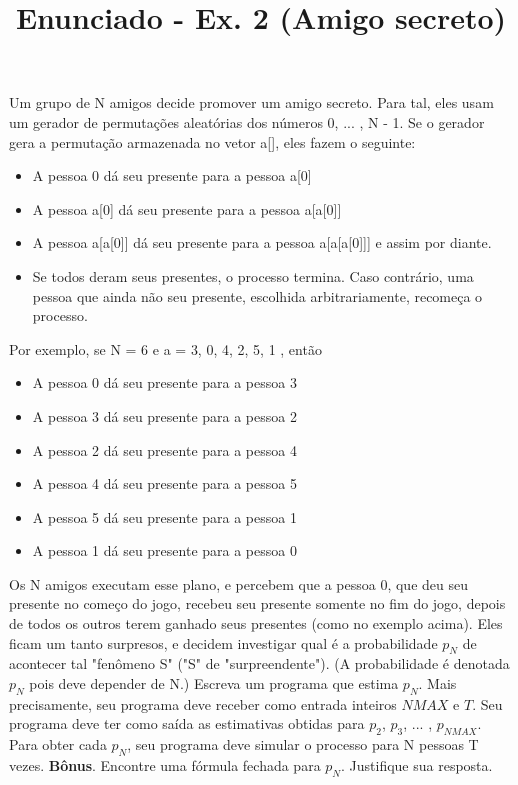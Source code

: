 \documentclass{article}
\title{Enunciado - Ex. 2 (Amigo secreto)}
\date{}
\author{}
\begin{document}
\maketitle

Um grupo de N amigos decide promover um amigo secreto. Para tal, eles usam um gerador de permuta\c{c}\~oes aleat\'orias dos n\'umeros 0, ... , N - 1. Se o gerador gera a permuta\c{c}\~ao armazenada no vetor a[], eles fazem o seguinte:
\begin{itemize}
  \item A pessoa 0 d\'a seu presente para a pessoa a[0]
  \item A pessoa a[0] d\'a seu presente para a pessoa a[a[0]]
  \item A pessoa a[a[0]] d\'a seu presente para a pessoa a[a[a[0]]] e assim por diante.
  \item Se todos deram seus presentes, o processo termina. Caso contr\'ario, uma pessoa que ainda n\~ao seu presente, escolhida arbitrariamente, recome\c{c}a o processo.
\end{itemize}
Por exemplo, se N = 6 e a = { 3, 0, 4, 2, 5, 1 }, ent\~ao
\begin{itemize}
\item A pessoa 0 d\'a seu presente para a pessoa 3
\item A pessoa 3 d\'a seu presente para a pessoa 2
\item A pessoa 2 d\'a seu presente para a pessoa 4
\item A pessoa 4 d\'a seu presente para a pessoa 5
\item A pessoa 5 d\'a seu presente para a pessoa 1
\item A pessoa 1 d\'a seu presente para a pessoa 0
\end{itemize}
Os N amigos executam esse plano, e percebem que a pessoa 0, que deu seu presente no come\c{c}o do jogo, recebeu seu presente somente no fim do jogo, depois de todos os outros terem ganhado seus presentes (como no exemplo acima). Eles ficam um tanto surpresos, e decidem investigar qual \'e a probabilidade $p_N$ de acontecer tal "fen\^omeno S" ("S" de "surpreendente"). (A probabilidade é denotada $p_N$ pois deve depender de N.)
\bigbreak
Escreva um programa que estima $p_N$.
\bigbreak
Mais precisamente, seu programa deve receber como entrada inteiros $NMAX$ e $T$. Seu programa deve ter como sa\'ida as estimativas obtidas para $p_2$, $p_3$, ... , $p_{NMAX}$. Para obter cada $p_N$, seu programa deve simular o processo para N pessoas T vezes.
\bigbreak
\textbf{B\^onus}. Encontre uma f\'ormula fechada para $p_N$. Justifique sua resposta.
\end{document}

